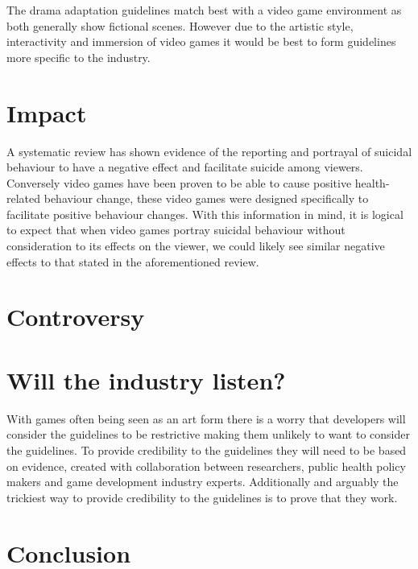 \documentclass{scrartcl}
\begin{document}
		The drama adaptation guidelines match best with a video game environment as both generally show fictional scenes. However due to the artistic style, interactivity and immersion of video games it would be best to form guidelines more specific to the industry. 	

	\section{Impact}
		A systematic review\cite{pirkis2001suicide} has shown evidence of the reporting and portrayal of suicidal behaviour to have a negative effect and facilitate suicide among viewers. Conversely video games have been proven to be able to cause positive health-related behaviour change\cite{baranowski2008playing}, these video games were designed specifically to facilitate positive behaviour changes. With this information in mind, it is logical to expect that when video games portray suicidal behaviour without consideration to its effects on the viewer, we could likely see similar negative effects to that stated in the aforementioned review\cite{pirkis2001suicide}.
		
	\section{Controversy}
	\section{Will the industry listen?}
		
		With games often being seen as an art form\cite{pearce2006games} there is a worry that developers will consider the guidelines to be restrictive making them unlikely to want to consider the guidelines. To provide credibility to the guidelines they will need to be based on evidence, created with collaboration between researchers, public health policy makers and game development industry experts\cite{hawton2002influences}. Additionally and arguably the trickiest way to  provide credibility to the guidelines is to prove that they work. 
	\section{Conclusion}

	
	
	
\end{document}
